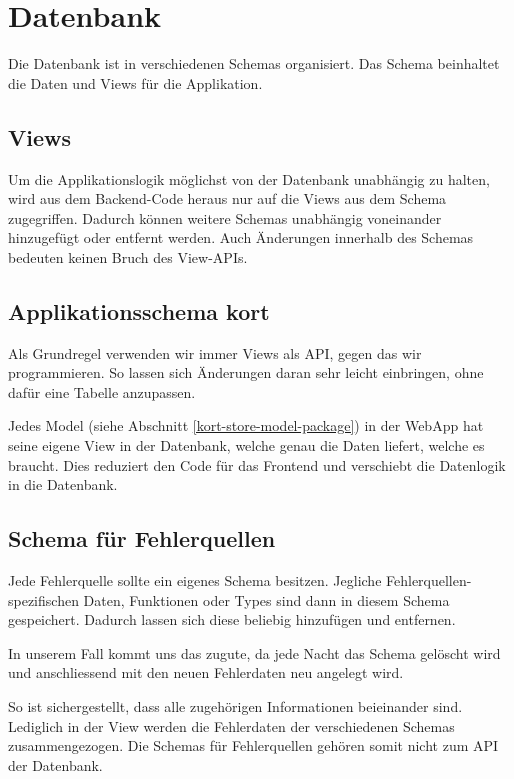 \section{Datenbank}
Die Datenbank ist in verschiedenen Schemas organisiert.
Das Schema  beinhaltet die Daten und Views für die Applikation.

\subsection{Views}
Um die Applikationslogik möglichst von der Datenbank unabhängig zu halten, wird aus dem Backend-Code heraus nur auf die Views aus dem Schema  zugegriffen.
Dadurch können weitere Schemas unabhängig voneinander hinzugefügt oder entfernt werden.
Auch Änderungen innerhalb des Schemas bedeuten keinen Bruch des View-\glspl{API}.

\subsection{Applikationsschema kort}
Als Grundregel verwenden wir immer Views als \gls{API}, gegen das wir programmieren.
So lassen sich Änderungen daran sehr leicht einbringen, ohne dafür eine Tabelle anzupassen.

Jedes Model (siehe Abschnitt \ref{kort-store-model-package})  in der \gls{WebApp} hat seine eigene View in der Datenbank, welche genau die Daten liefert, welche es braucht.
Dies reduziert den Code für das Frontend und verschiebt die Datenlogik in die Datenbank.

\subsection{Schema für Fehlerquellen}
Jede Fehlerquelle sollte ein eigenes Schema besitzen.
Jegliche Fehlerquellen-spezifischen Daten, Funktionen oder Types sind dann in diesem Schema gespeichert.
Dadurch lassen sich diese beliebig hinzufügen und entfernen.

In unserem Fall kommt uns das zugute, da jede Nacht das  Schema gelöscht wird und anschliessend mit den neuen Fehlerdaten neu angelegt wird.

So ist sichergestellt, dass alle zugehörigen Informationen beieinander sind.
Lediglich in der View  werden die Fehlerdaten der verschiedenen Schemas zusammengezogen.
Die Schemas für Fehlerquellen gehören somit nicht zum \gls{API} der Datenbank.

